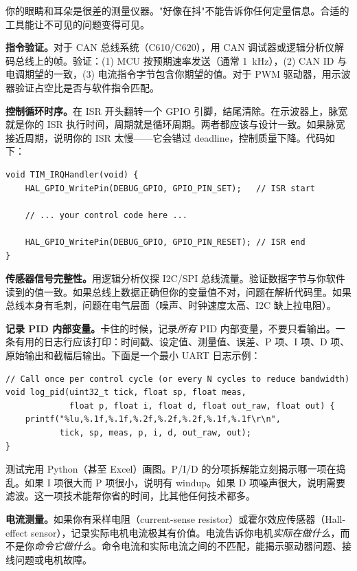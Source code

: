 你的眼睛和耳朵是很差的测量仪器。"好像在抖"不能告诉你任何定量信息。合适的工具能让不可见的问题变得可见。

\textbf{指令验证。}对于 CAN 总线系统（C610/C620），用 CAN 调试器或逻辑分析仪解码总线上的帧。验证：(1) MCU 按预期速率发送（通常 1~kHz），(2) CAN ID 与电调期望的一致，(3) 电流指令字节包含你期望的值。对于 PWM 驱动器，用示波器验证占空比是否与软件指令匹配。

\textbf{控制循环时序。}在 ISR 开头翻转一个 GPIO 引脚，结尾清除。在示波器上，脉宽就是你的 ISR 执行时间，周期就是循环周期。两者都应该与设计一致。如果脉宽接近周期，说明你的 ISR 太慢——它会错过 deadline，控制质量下降。代码如下：

\begin{verbatim}
void TIM_IRQHandler(void) {
    HAL_GPIO_WritePin(DEBUG_GPIO, GPIO_PIN_SET);   // ISR start

    // ... your control code here ...

    HAL_GPIO_WritePin(DEBUG_GPIO, GPIO_PIN_RESET); // ISR end
}
\end{verbatim}

\textbf{传感器信号完整性。}用逻辑分析仪探 I2C/SPI 总线流量。验证数据字节与你软件读到的值一致。如果总线上数据正确但你的变量值不对，问题在解析代码里。如果总线本身有毛刺，问题在电气层面（噪声、时钟速度太高、I2C 缺上拉电阻）。

\textbf{记录 PID 内部变量。}卡住的时候，记录\textit{所有} PID 内部变量，不要只看输出。一条有用的日志行应该打印：时间戳、设定值、测量值、误差、P 项、I 项、D 项、原始输出和截幅后输出。下面是一个最小 UART 日志示例：

\begin{verbatim}
// Call once per control cycle (or every N cycles to reduce bandwidth)
void log_pid(uint32_t tick, float sp, float meas,
             float p, float i, float d, float out_raw, float out) {
    printf("%lu,%.1f,%.1f,%.2f,%.2f,%.2f,%.1f,%.1f\r\n",
           tick, sp, meas, p, i, d, out_raw, out);
}
\end{verbatim}

测试完用 Python（甚至 Excel）画图。P/I/D 的分项拆解能立刻揭示哪一项在捣乱。如果 I 项很大而 P 项很小，说明有 windup。如果 D 项噪声很大，说明需要滤波。这一项技术能帮你省的时间，比其他任何技术都多。

\textbf{电流测量。}如果你有采样电阻（current-sense resistor）或霍尔效应传感器（Hall-effect sensor），记录实际电机电流极其有价值。电流告诉你电机\textit{实际在做什么}，而不是你\textit{命令它做什么}。命令电流和实际电流之间的不匹配，能揭示驱动器问题、接线问题或电机故障。

